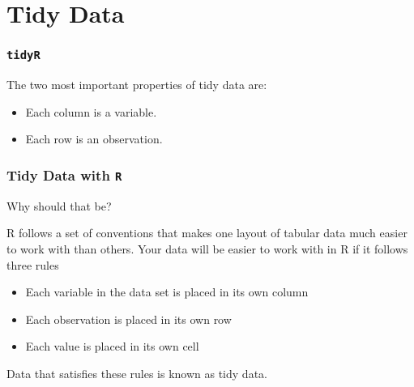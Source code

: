 \documentclass[TIDYMASTER.tex]{subfiles}
\begin{document}
 




\section{Tidy Data}
\begin{frame}
	\frametitle{\texttt{tidyR} }
	
	The two most important properties of tidy data are:
	\begin{itemize}
		\item Each column is a variable.
		\item Each row is an observation.
	\end{itemize}
\end{frame}
\begin{frame}[fragile]
	\frametitle{Tidy Data with \texttt{R}}
	\Large
	Why should that be?
	
	R follows a set of conventions that makes one layout of tabular data much easier to work with than others. Your data will be easier to work with in R if it follows three rules
	
	\begin{itemize}
		\item Each variable in the data set is placed in its own column
		\item Each observation is placed in its own row
		\item Each value is placed in its own cell
		
	\end{itemize}
	Data that satisfies these rules is known as tidy data. %
\end{frame}
\end{document}
